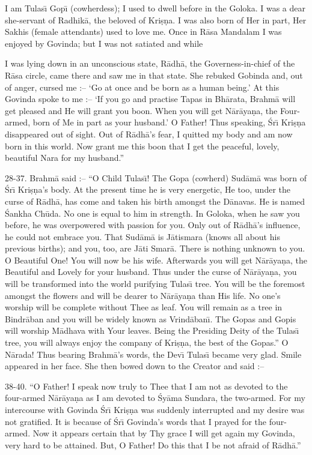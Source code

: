 I am Tulas\={\i} Gop\={\i} (cowherdess); I used to dwell before in the Goloka. I was a dear she-servant of Radhik\=a, the beloved of Kri\d{s}\d{n}a. I was also born of Her in part, Her Sakhis (female attendants) used to love me. Once in R\=asa Mandalam I was enjoyed by Govinda; but I was not satiated and while

I was lying down in an unconscious state, R\=adh\=a, the Governess-in-chief of the R\=asa circle, came there and saw me in that state. She rebuked Gobinda and, out of anger, cursed me :-- `Go at once and be born as a human being.' At this Govinda spoke to me :-- `If you go and practise Tapas in Bh\=arata, Brahm\=a will get pleased and He will grant you boon. When you will get N\=ar\=aya\d{n}a, the Four-armed, born of Me in part as your husband.' O Father! Thus speaking, \'Sr\={\i} Kri\d{s}\d{n}a disappeared out of sight. Out of R\=adh\=a's fear, I quitted my body and am now born in this world. Now grant me this boon that I get the peaceful, lovely, beautiful Nara for my husband.''

28-37. Brahm\=a said :-- ``O Child Tulas\={\i}! The Gopa (cowherd) Sud\=am\=a was born of \'Sr\={\i} Kri\d{s}\d{n}a's body. At the present time he is very energetic, He too, under the curse of R\=adh\=a, has come and taken his birth amongst the D\=anavas. He is named \'Sankha Ch\=uda. No one is equal to him in strength. In Goloka, when he saw you before, he was overpowered with passion for you. Only out of R\=adh\=a's influence, he could not embrace you. That Sud\=am\=a is J\=atismara (knows all about his previous births); and you, too, are J\=ati Smar\=a. There is nothing unknown to you. O Beautiful One! You will now be his wife. Afterwards you will get N\=ar\=aya\d{n}a, the Beautiful and Lovely for your husband. Thus under the curse of N\=ar\=aya\d{n}a, you will be transformed into the world purifying Tulas\={\i} tree. You will be the foremost amongst the flowers and will be dearer to N\=ar\=aya\d{n}a than His life. No one's worship will be complete without Thee as leaf. You will remain as a tree in Bindr\=aban and you will be widely known as Vrind\=aban\={\i}. The Gopas and Gopis will worship M\=adhava with Your leaves. Being the Presiding Deity of the Tulas\={\i} tree, you will always enjoy the company of Kri\d{s}\d{n}a, the best of the Gopas.'' O N\=arada! Thus bearing Brahm\=a's words, the Dev\={\i} Tulas\={\i} became very glad. Smile appeared in her face. She then bowed down to the Creator and said :--

38-40. ``O Father! I speak now truly to Thee that I am not as devoted to the four-armed N\=ar\=aya\d{n}a as I am devoted to \'Sy\=ama Sundara, the two-armed. For my intercourse with Govinda \'Sr\={\i} Kri\d{s}\d{n}a was suddenly interrupted and my desire was not gratified. It is because of \'Sr\={\i} Govinda's words that I prayed for the four-armed. Now it appears certain that by Thy grace I will get again my Govinda, very hard to be attained. But, O Father! Do this that I be not afraid of R\=adh\=a.''

